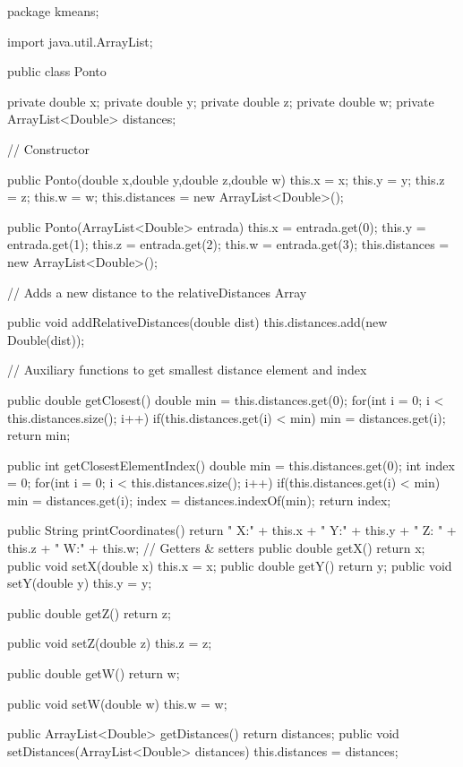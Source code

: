 \documentclass[10pt,twocolumn,letterpaper]{article}
\begin{document}
\begin{spverbatim}
package kmeans;

import java.util.ArrayList;


public class Ponto {
		private double x;
		private double y;
		private double z;
		private double w;
		private ArrayList<Double> distances;
		
		// Constructor 
		
		public Ponto(double x,double y,double z,double w){
			this.x = x;
			this.y = y;
			this.z = z;
			this.w = w;
			this.distances = new ArrayList<Double>();
		}
		
		public Ponto(ArrayList<Double> entrada){
			this.x = entrada.get(0);
			this.y = entrada.get(1);
			this.z = entrada.get(2);
			this.w = entrada.get(3);
			this.distances = new ArrayList<Double>();
		}
		
		// Adds a new distance to the relativeDistances Array
		
		public void addRelativeDistances(double dist){
			this.distances.add(new Double(dist));
		}
		
		// Auxiliary functions to get smallest distance element and index 
		
		public double getClosest(){
			double min = this.distances.get(0);
			for(int i = 0; i < this.distances.size(); i++){
				if(this.distances.get(i) < min){
					min = distances.get(i);
				}
			}
			return min;
		}
		
		public int getClosestElementIndex(){
			double min = this.distances.get(0);
			int index = 0;
			for(int i = 0; i < this.distances.size(); i++){
				if(this.distances.get(i) < min){
					min = distances.get(i);
					index = distances.indexOf(min);
				}
			}
			return index;
		}
		
		public String printCoordinates(){
			return " X:" + this.x + " Y:" + this.y + " Z: " + this.z + " W:" + this.w;
		}
		// Getters & setters
		public double getX() {
			return x;
		}
		public void setX(double x) {
			this.x = x;
		}
		public double getY() {
			return y;
		}
		public void setY(double y) {
			this.y = y;
		}
		
		public double getZ() {
			return z;
		}

		public void setZ(double z) {
			this.z = z;
		}

		public double getW() {
			return w;
		}

		public void setW(double w) {
			this.w = w;
		}

		public ArrayList<Double> getDistances() {
			return distances;
		}
		public void setDistances(ArrayList<Double> distances) {
			this.distances = distances;
		}

}
\end{spverbatim}
\end{document}
